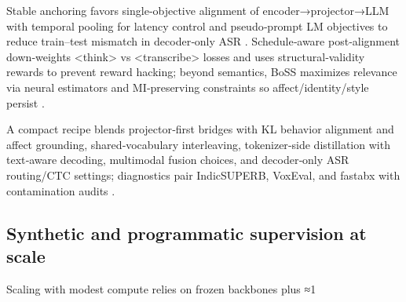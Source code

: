 \documentclass{article}
\begin{document}
Stable anchoring favors single‑objective alignment of encoder→projector→LLM with temporal pooling for latency control and pseudo‑prompt LM objectives to reduce train–test mismatch in decoder‑only ASR \cite{nguyen2025qwenvsgemmaintegrationwhispercomparative,tsunoo2024decoderonlyarchitecturespeechrecognition}. Schedule‑aware post‑alignment down‑weights <think> vs <transcribe> losses and uses structural‑validity rewards to prevent reward hacking; beyond semantics, BoSS maximizes relevance via neural estimators and MI‑preserving constraints so affect/identity/style persist \cite{li2025seewossubmissionmlcslmlessonslearnedspee,wang2025bossbeyondsemanticspeech}.

A compact recipe blends projector‑first bridges with KL behavior alignment and affect grounding, shared‑vocabulary interleaving, tokenizer‑side distillation with text‑aware decoding, multimodal fusion choices, and decoder‑only ASR routing/CTC settings; diagnostics pair IndicSUPERB, VoxEval, and fastabx with contamination audits \cite{nguyen2025qwenvsgemmaintegrationwhispercomparative,wang2024blspemotowardsempatheticlargespeechlangu,zeng2024scalingspeechtextpretrainingsyntheticint,ahasan2025dmcodecdistillingmultimodalrepresentatio,wang2025tadicodectextawarediffusionspeechtokeniz,sadok2025vectorquantizedmaskedautoencoderaudiovis,tsunoo2024decoderonlyarchitecturespeechrecognition,li2025seewossubmissionmlcslmlessonslearnedspee,wang2025bossbeyondsemanticspeech,entry2025indicsuperbspeechprocessinguniversalperf,turetzky2024lastlanguagemodelawarespeechtokenization,cui2025voxevalbenchmarkingknowledgeunderstandin,tseng2025evaluationllmsspeechisoftenflawedtestset}.

\subsection{Synthetic and programmatic supervision at scale} \label{subsec:Synthetic and programmatic supervision at scale}
Scaling with modest compute relies on frozen backbones plus ≈1%
\end{document}
